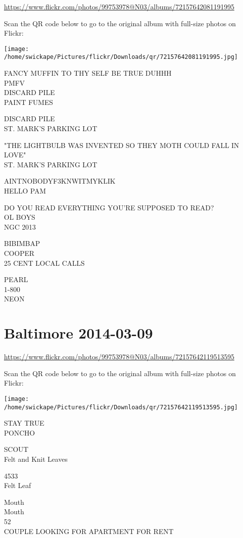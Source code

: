 \documentclass[10pt,letterpaper]{article}
\begin{document}
\url{https://www.flickr.com/photos/99753978@N03/albums/72157642081191995}

Scan the QR code below to go to the original album with full-size photos on Flickr:

\texttt{[image: /home/swickape/Pictures/flickr/Downloads/qr/72157642081191995.jpg]}
\pagebreak

FANCY MUFFIN TO THY SELF BE TRUE DUHHH\\
PMFV\\
DISCARD PILE\\
PAINT FUMES

DISCARD PILE\\
ST. MARK'S PARKING LOT

"THE LIGHTBULB WAS INVENTED SO THEY MOTH COULD FALL IN LOVE"\\
ST. MARK'S PARKING LOT

AINTNOBODYF3KNWITMYKLIK\\
HELLO PAM

DO YOU READ EVERYTHING YOU'RE SUPPOSED TO READ?\\
OL BOYS\\
NGC 2013

BIBIMBAP\\
COOPER\\
25 CENT LOCAL CALLS

PEARL\\
1{-}800\\
NEON
\pagebreak

\section*{Baltimore 2014-03-09}

\url{https://www.flickr.com/photos/99753978@N03/albums/72157642119513595}

Scan the QR code below to go to the original album with full-size photos on Flickr:

\texttt{[image: /home/swickape/Pictures/flickr/Downloads/qr/72157642119513595.jpg]}
\pagebreak

STAY TRUE\\
PONCHO

SCOUT\\
Felt and Knit Leaves

4533\\
Felt Leaf

Mouth\\
Mouth\\
52\\
COUPLE LOOKING FOR APARTMENT FOR RENT
\end{document}
